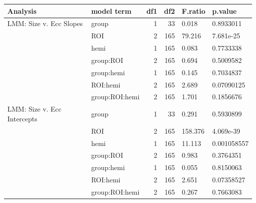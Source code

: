 \begin{table}
\centering
\begin{tabular}{llrrll}
\toprule
Analysis & model term & df1 & df2 & F.ratio & p.value\\
\midrule
LMM: Size v. Ecc Slopes & group & 1 & 33 & 0.018 & 0.8933011\\
 & ROI & 2 & 165 & 79.216 & 7.681e-25\\
 & hemi & 1 & 165 & 0.083 & 0.7733338\\
 & group:ROI & 2 & 165 & 0.694 & 0.5009582\\
 & group:hemi & 1 & 165 & 0.145 & 0.7034837\\
\addlinespace
 & ROI:hemi & 2 & 165 & 2.689 & 0.07090125\\
 & group:ROI:hemi & 2 & 165 & 1.701 & 0.1856676\\
LMM: Size v. Ecc Intercepts & group & 1 & 33 & 0.291 & 0.5930899\\
 & ROI & 2 & 165 & 158.376 & 4.069e-39\\
 & hemi & 1 & 165 & 11.113 & 0.001058557\\
\addlinespace
 & group:ROI & 2 & 165 & 0.983 & 0.3764351\\
 & group:hemi & 1 & 165 & 0.055 & 0.8150063\\
 & ROI:hemi & 2 & 165 & 2.651 & 0.07358527\\
 & group:ROI:hemi & 2 & 165 & 0.267 & 0.7663083\\
\bottomrule
\end{tabular}
\end{table}
